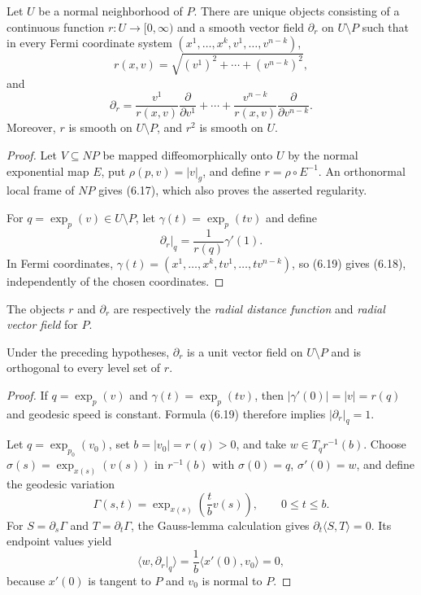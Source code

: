 \begin{proposition}
\label{prop:fermi-coordinates-radial-function}

Let $U$ be a normal neighborhood of $P$. There are unique objects consisting
of a continuous function $r:U\to[0,\infty)$ and a smooth vector field
$\partial_r$ on $U\setminus P$ such that in every Fermi coordinate system
$(x^1,\ldots,x^k,v^1,\ldots,v^{n-k})$,
\begin{equation}
r(x,v)=\sqrt{(v^1)^2+\cdots+(v^{n-k})^2},
\tag{6.17}
\end{equation}
and
\begin{equation}
\partial_r
=\frac{v^1}{r(x,v)}\frac{\partial}{\partial v^1}
+\cdots+
\frac{v^{n-k}}{r(x,v)}\frac{\partial}{\partial v^{n-k}}.
\tag{6.18}
\end{equation}
Moreover, $r$ is smooth on $U\setminus P$, and $r^2$ is smooth on $U$.
\end{proposition}

\begin{proof}
\sketch Let $V\subseteq NP$ be mapped diffeomorphically onto $U$ by the
normal exponential map $E$, put $\rho(p,v)=|v|_g$, and define
$r=\rho\circ E^{-1}$. An orthonormal local frame of $NP$ gives (6.17), which
also proves the asserted regularity.

For $q=\exp_p(v)\in U\setminus P$, let $\gamma(t)=\exp_p(tv)$ and define
\begin{equation}
\partial_r|_q=\frac1{r(q)}\gamma'(1).
\tag{6.19}
\end{equation}
In Fermi coordinates, $\gamma(t)=(x^1,\ldots,x^k,tv^1,\ldots,tv^{n-k})$,
so (6.19) gives (6.18), independently of the chosen coordinates.
\end{proof}

The objects $r$ and $\partial_r$ are respectively the \emph{radial distance
function} and \emph{radial vector field} for $P$.

\begin{theorem}
\label{thm:gauss-lemma-submanifolds}

Under the preceding hypotheses, $\partial_r$ is a unit vector field on
$U\setminus P$ and is orthogonal to every level set of $r$.
\end{theorem}

\begin{proof}
\sketch If $q=\exp_p(v)$ and $\gamma(t)=\exp_p(tv)$, then
$|\gamma'(0)|=|v|=r(q)$ and geodesic speed is constant. Formula (6.19) therefore
implies $|\partial_r|_q=1$.

Let $q=\exp_{p_0}(v_0)$, set $b=|v_0|=r(q)>0$, and take
$w\in T_qr^{-1}(b)$. Choose
$\sigma(s)=\exp_{x(s)}(v(s))$ in $r^{-1}(b)$ with
$\sigma(0)=q$, $\sigma'(0)=w$, and define the geodesic variation
\[
\Gamma(s,t)=\exp_{x(s)}\left(\frac tbv(s)\right),
\qquad 0\leq t\leq b.
\]
For $S=\partial_s\Gamma$ and $T=\partial_t\Gamma$, the Gauss-lemma
calculation gives $\partial_t\langle S,T\rangle=0$. Its endpoint values yield
\[
\langle w,\partial_r|_q\rangle
=\frac1b\langle x'(0),v_0\rangle=0,
\]
because $x'(0)$ is tangent to $P$ and $v_0$ is normal to $P$.
\end{proof}

